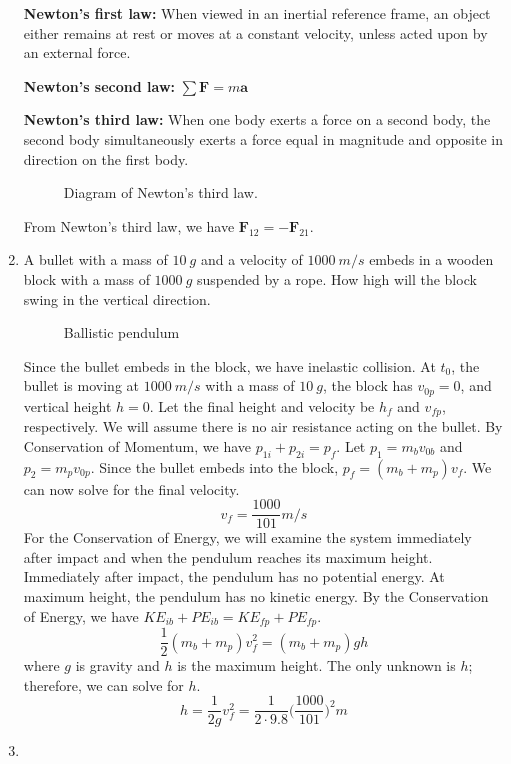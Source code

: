 \begin{enumerate}
  \textbf{Newton's first law:} When viewed in an inertial reference frame, an
  object either remains at rest or moves at a constant velocity, unless acted
  upon by an external force.
  \par\smallskip
  \textbf{Newton's second law:} \(\sum\mathbf{F} = m\mathbf{a}\)
  \par\smallskip
  \textbf{Newton's third law:} When one body exerts a force on a second body,
  the second body simultaneously exerts a force equal in magnitude and opposite
  in direction on the first body.
  \begin{figure}[H]
    \centering
    
    \caption{Diagram of Newton's third law.}
  \end{figure}
  From Newton's third law, we have \(\mathbf{F}_{12} = -\mathbf{F}_{21}\).
\item
  A bullet with a mass of \(10 \ g\) and a velocity of \(1000 \ m/s\) embeds
  in a wooden block with a mass of \(1000 \ g\) suspended by a rope.
  How high will the block swing in the vertical direction.
  \begin{figure}[H]
    \centering
    
    \caption{Ballistic pendulum}
  \end{figure}
  Since the bullet embeds in the block, we have inelastic collision.
  At \(t_0\), the bullet is moving at \(1000 \ m/s\) with a mass of \(10 \ g\),
  the block has \(v_{0p} = 0\), and vertical height \(h = 0\).
  Let the final height and velocity be \(h_f\) and \(v_{fp}\), respectively.
  We will assume there is no air resistance acting on the bullet.
  By Conservation of Momentum, we have \(p_{1i} + p_{2i} = p_f\).
  Let \(p_1 = m_bv_{0b}\) and \(p_2 = m_pv_{0p}\).
  Since the bullet embeds into the block, \(p_f = (m_b + m_p)v_f\).
  We can now solve for the final velocity.
  \[
  v_f = \frac{1000}{101} m/s
  \]
  For the Conservation of Energy, we will examine the system immediately after
  impact and when the pendulum reaches its maximum height.
  Immediately after impact, the pendulum has no potential energy.
  At maximum height, the pendulum has no kinetic energy.
  By the Conservation of Energy, we have
  \(KE_{ib} + PE_{ib} = KE_{fp} + PE_{fp}\).
  \[
  \frac{1}{2}(m_b + m_p)v_f^2 = (m_b + m_p)gh
  \]
  where \(g\) is gravity and \(h\) is the maximum height.
  The only unknown is \(h\); therefore, we can solve for \(h\).
  \[
  h = \frac{1}{2g}v_f^2 = \frac{1}{2\cdot 9.8}\Big(\frac{1000}{101}\Big)^2 m
  \]
\item

\end{enumerate}
